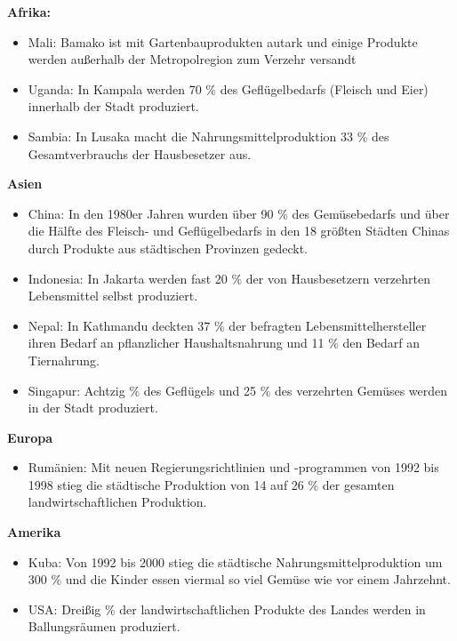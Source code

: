 \documentclass{scrartcl}
\begin{document}
\begin{displayquote}
\textbf{Afrika:}
\begin{itemize}
    \item Mali: Bamako ist mit Gartenbauprodukten autark und einige Produkte werden außerhalb der Metropolregion zum Verzehr versandt
    \item Uganda: In Kampala werden 70 \% des Geflügelbedarfs (Fleisch und Eier) innerhalb der Stadt produziert.
    \item Sambia: In Lusaka macht die Nahrungsmittelproduktion 33 \% des Gesamtverbrauchs der Hausbesetzer aus.
\end{itemize}
\textbf{Asien}
\begin{itemize}
    \item China: In den 1980er Jahren wurden über 90 \% des Gemüsebedarfs und über die Hälfte des Fleisch- und Geflügelbedarfs in den 18 größten Städten Chinas durch Produkte aus städtischen Provinzen gedeckt.
    \item Indonesia: In Jakarta werden fast 20 \% der von Hausbesetzern verzehrten Lebensmittel selbst produziert.
    \item Nepal: In Kathmandu deckten 37 \% der befragten Lebensmittelhersteller ihren Bedarf an pflanzlicher Haushaltsnahrung und 11 \% den Bedarf an Tiernahrung.
    \item Singapur: Achtzig \% des Geflügels und 25 \% des verzehrten Gemüses werden in der Stadt produziert.
\end{itemize}
\textbf{Europa}
\begin{itemize}
    \item Rumänien: Mit neuen Regierungsrichtlinien und -programmen von 1992 bis 1998 stieg die städtische Produktion von 14 auf 26 \% der gesamten landwirtschaftlichen Produktion.
\end{itemize}
\textbf{Amerika}
\begin{itemize}
    \item Kuba: Von 1992 bis 2000 stieg die städtische Nahrungsmittelproduktion um 300 \% und die Kinder essen viermal so viel Gemüse wie vor einem Jahrzehnt.
    \item USA: Dreißig \% der landwirtschaftlichen Produkte des Landes werden in Ballungsräumen produziert.
\end{itemize}
\end{displayquote}
\end{document}
